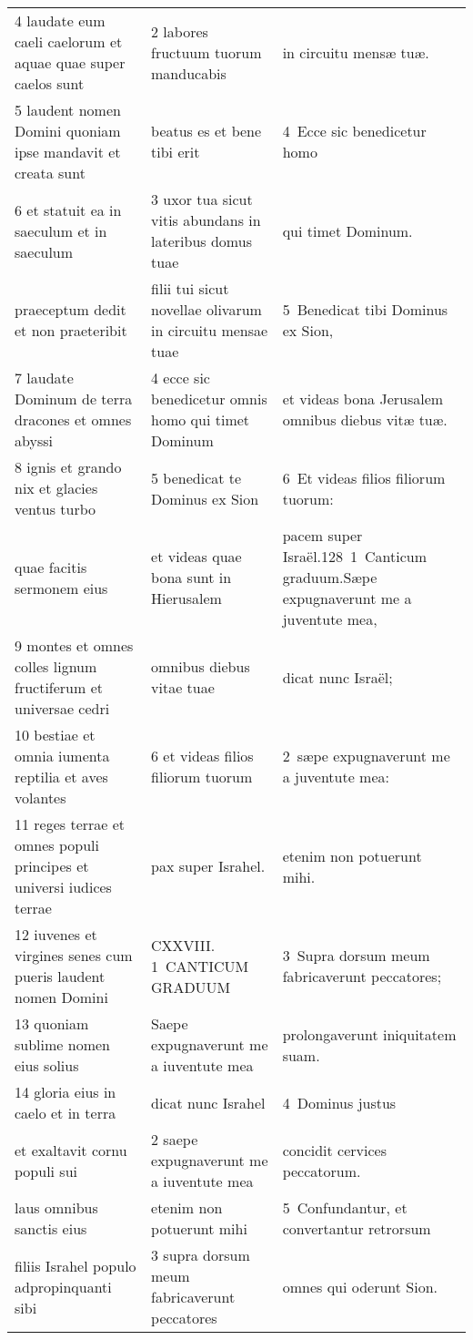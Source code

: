 \documentclass{article}
\begin{document}
\begin{longtable}{@{}p{}p{}p{}@{}}
4 laudate eum caeli caelorum et aquae quae super caelos sunt	&	2 labores fructuum tuorum manducabis	&	in circuitu mensæ tuæ.	\\
5 laudent nomen Domini quoniam ipse mandavit et creata sunt	&	beatus es et bene tibi erit	&	4 Ecce sic benedicetur homo	\\
6 et statuit ea in saeculum et in saeculum	&	3 uxor tua sicut vitis abundans in lateribus domus tuae	&	qui timet Dominum.	\\
praeceptum dedit et non praeteribit	&	filii tui sicut novellae olivarum in circuitu mensae tuae	&	5 Benedicat tibi Dominus ex Sion,	\\
7 laudate Dominum de terra dracones et omnes abyssi	&	4 ecce sic benedicetur omnis homo qui timet Dominum	&	et videas bona Jerusalem omnibus diebus vitæ tuæ.	\\
8 ignis et grando nix et glacies ventus turbo	&	5 benedicat te Dominus ex Sion	&	6 Et videas filios filiorum tuorum:	\\
quae facitis sermonem eius	&	et videas quae bona sunt in Hierusalem	&	pacem super Israël.128 1 Canticum graduum.Sæpe expugnaverunt me a juventute mea,	\\
9 montes et omnes colles lignum fructiferum et universae cedri	&	omnibus diebus vitae tuae	&	dicat nunc Israël;	\\
10 bestiae et omnia iumenta reptilia et aves volantes	&	6 et videas filios filiorum tuorum	&	2 sæpe expugnaverunt me a juventute mea:	\\
11 reges terrae et omnes populi principes et universi iudices terrae	&	pax super Israhel.	&	etenim non potuerunt mihi.	\\
12 iuvenes et virgines senes cum pueris laudent nomen Domini	&	CXXVIII. 1 CANTICUM GRADUUM	&	3 Supra dorsum meum fabricaverunt peccatores;	\\
13 quoniam sublime nomen eius solius	&	Saepe expugnaverunt me a iuventute mea	&	prolongaverunt iniquitatem suam.	\\
14 gloria eius in caelo et in terra	&	dicat nunc Israhel	&	4 Dominus justus	\\
et exaltavit cornu populi sui	&	2 saepe expugnaverunt me a iuventute mea	&	concidit cervices peccatorum.	\\
laus omnibus sanctis eius	&	etenim non potuerunt mihi	&	5 Confundantur, et convertantur retrorsum	\\
filiis Israhel populo adpropinquanti sibi	&	3 supra dorsum meum fabricaverunt peccatores	&	omnes qui oderunt Sion.	\\

\end{longtable}
\end{document}

